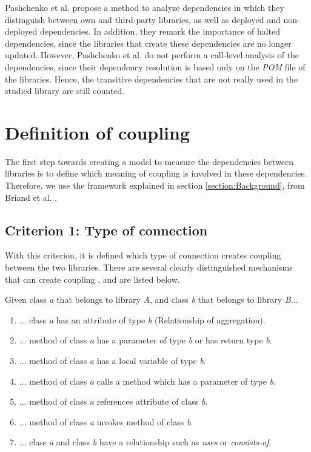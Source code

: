 \documentclass[a4paper]{article}
\begin{document}
Pashchenko et al. \cite{pashchenko2018vulnerable} propose a method to analyze dependencies in which they distinguish between own and third-party libraries, as well as deployed and non-deployed dependencies. In addition, they remark the importance of halted dependencies, since the libraries that create these dependencies are no longer updated. However, Pashchenko et al. do not perform a call-level analysis of the dependencies, since their dependency resolution is based only on the \textit{POM} file of the libraries. Hence, the transitive dependencies that are not really used in the studied library are still counted.

\section{Definition of coupling}
The first step towards creating a model to measure the dependencies between libraries is to define which meaning of coupling is involved in these dependencies. Therefore, we use the framework explained in section \ref{section:Background}, from Briand et al. \cite{briand1999unified}.

\subsection{Criterion 1: Type of connection}
With this criterion, it is defined which type of connection creates coupling between the two libraries. There are several clearly distinguished mechanisms that can create coupling \cite{briand1999unified}, and are listed below.

Given class \textit{a} that belongs to library \textit{A}, and class \textit{b} that belongs to library \textit{B}...

\begin{enumerate}[noitemsep,leftmargin=*]
  \item ... class \textit{a} has an attribute of type \textit{b} (Relationship of aggregation).
  \item ... method of class \textit{a} has a parameter of type \textit{b} or has return type \textit{b}.
  \item ... method of class \textit{a} has a local variable of type \textit{b}.
  \item ... method of class \textit{a} calls a method which has a parameter of type \textit{b}.
  \item ... method of class \textit{a} references attribute of class \textit{b}.
  \item ... method of class \textit{a} invokes method of class \textit{b}.
  \item ... class \textit{a} and class \textit{b} have a relationship such as \textit{uses} or \textit{consists-of}.
\end{enumerate}
\end{document}
